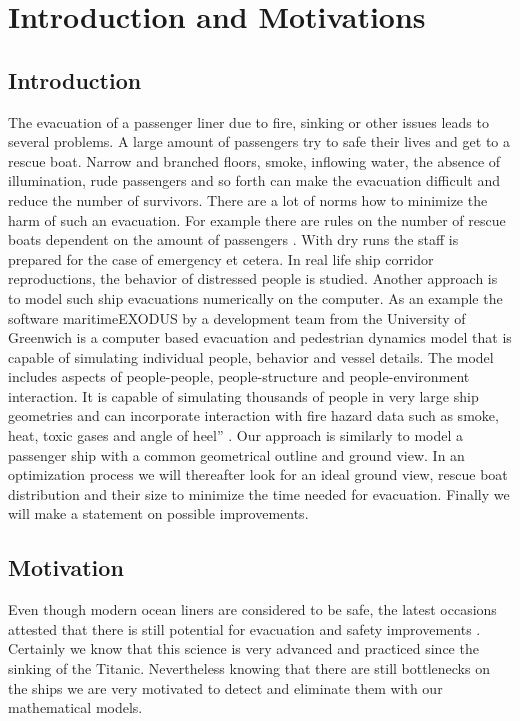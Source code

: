 \documentclass[11pt]{article}
\begin{document}
\newpage
\section{Introduction and Motivations}
\subsection{Introduction}
The evacuation of a passenger liner due to fire, sinking or other issues leads to several problems. A large amount of passengers try to safe their lives and get to a rescue boat. Narrow and branched floors, smoke, inflowing water, the absence of illumination, rude passengers and so forth can make the evacuation difficult and reduce the number of survivors.
There are a lot of norms how to minimize the harm of such an evacuation. For example there are rules on the number of rescue boats dependent on the amount of passengers \cite{SOLAS}. With dry runs the staff is prepared for the case of emergency et cetera. In real life ship corridor reproductions, the behavior of distressed people is studied.
Another approach is to model such ship evacuations numerically on the computer. As an example the software maritimeEXODUS by a development team from the University of Greenwich is a computer based evacuation and pedestrian dynamics model that is capable of simulating individual people, behavior and vessel details. The model includes aspects of people-people, people-structure and people-environment interaction. It is capable of simulating thousands of people in very large ship geometries and can incorporate interaction with fire hazard data such as smoke, heat, toxic gases and angle of heel” \cite{EXODUS}.
Our approach is similarly to model a passenger ship with a common geometrical outline and ground view. In an optimization process we will thereafter look for an ideal ground view, rescue boat distribution and their size to minimize the time needed for evacuation. Finally we will make a statement on possible improvements.
\subsection{Motivation}
Even though modern ocean liners are considered to be safe, the latest occasions attested that there is still potential for evacuation and safety improvements \cite{concordia}. Certainly we know that this science is very advanced and practiced since the sinking of the Titanic. Nevertheless knowing that there are still bottlenecks on the ships we are very motivated to detect and eliminate them with our mathematical models.
\end{document}
